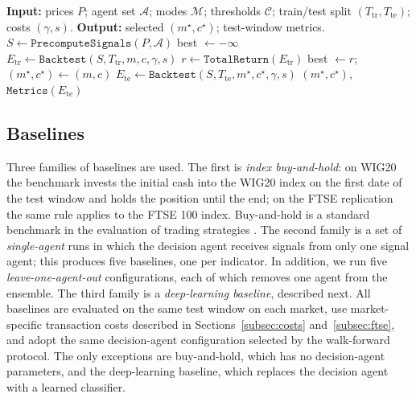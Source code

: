 \documentclass{ieeeaccess}
\begin{document}
\begin{algorithm}[t]
\caption{Anchored walk-forward with precomputed signals}
\label{alg:wf}
\begin{algorithmic}[1]
\STATE \textbf{Input:} prices $P$; agent set $\mathcal{A}$; modes $\mathcal{M}$; thresholds $\mathcal{C}$; train/test split $(T_\text{tr}, T_\text{te})$; costs $(\gamma, s)$.
\STATE \textbf{Output:} selected $(m^\star, c^\star)$; test-window metrics.
\STATE $S \gets \mathtt{PrecomputeSignals}(P, \mathcal{A})$ 
\STATE best $\gets -\infty$
  \STATE $E_\text{tr} \gets \mathtt{Backtest}(S, T_\text{tr}, m, c, \gamma, s)$
  \STATE $r \gets \mathtt{TotalReturn}(E_\text{tr})$
    \STATE best $\gets r$; $(m^\star, c^\star) \gets (m, c)$
  \ENDIF
\ENDFOR
\STATE $E_\text{te} \gets \mathtt{Backtest}(S, T_\text{te}, m^\star, c^\star, \gamma, s)$
\RETURN $(m^\star, c^\star)$, $\mathtt{Metrics}(E_\text{te})$
\end{algorithmic}
\end{algorithm}

\subsection{Baselines}
\label{subsec:baselines}

Three families of baselines are used. The first is \emph{index buy-and-hold}: on WIG20 the benchmark invests the initial cash into the WIG20 index on the first date of the test window and holds the position until the end; on the FTSE replication the same rule applies to the FTSE 100 index. Buy-and-hold is a standard benchmark in the evaluation of trading strategies \cite{dichtl2020}. The second family is a set of \emph{single-agent} runs in which the decision agent receives signals from only one signal agent; this produces five baselines, one per indicator. In addition, we run five \emph{leave-one-agent-out} configurations, each of which removes one agent from the ensemble. The third family is a \emph{deep-learning baseline}, described next. All baselines are evaluated on the same test window on each market, use market-specific transaction costs described in Sections~\ref{subsec:costs} and~\ref{subsec:ftse}, and adopt the same decision-agent configuration selected by the walk-forward protocol. The only exceptions are buy-and-hold, which has no decision-agent parameters, and the deep-learning baseline, which replaces the decision agent with a learned classifier.
\end{document}
